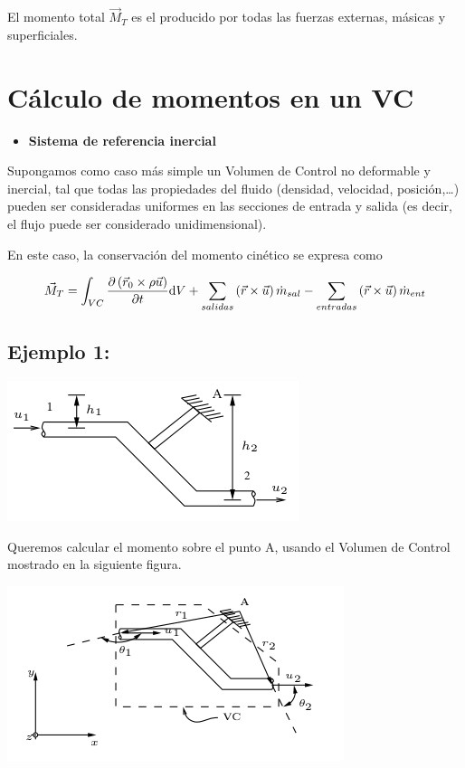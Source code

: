 	El momento total $\vec{M}_{T}$ es el producido por todas las fuerzas
	externas, másicas y superficiales.


\section{Cálculo de momentos en un VC}

	
	\begin{itemize}
		\item \textbf{Sistema de referencia inercial}
	\end{itemize}
	Supongamos como caso más simple un Volumen de Control no deformable
	y inercial, tal que todas las propiedades del fluido (densidad, velocidad,
	posición,\ldots ) pueden ser consideradas uniformes en las secciones
	de entrada y salida (es decir, el flujo puede ser considerado unidimensional). 
	
	En este caso, la conservación del momento cinético se expresa como
	
\begin{equation}
		\vec{M}_{T}=\int_{VC}\frac{\partial \left(\vec{r}_{0}\times\rho\vec{u}\right)}{\partial t}\text{d} V+\sum_{salidas}\left(\vec{r}\times\vec{u}\right)\dot{m}_{sal}-\sum_{entradas}\left(\vec{r}\times\vec{u}\right)\dot{m}_{ent}
\end{equation}
	
	

	
	\subsection{Ejemplo 1:}
		
		\begin{center}
			\includegraphics[width=0.5\linewidth]{TeX_files/chapter04-Dinamica/ejemplo1CMC}
		\end{center}
		
		
		Queremos calcular el momento sobre el punto A, usando el Volumen de
		Control mostrado en la siguiente figura.
		
		\begin{center}
			\includegraphics[width=0.5\linewidth]{TeX_files/chapter04-Dinamica/ejemplo1CMC1}
		\end{center}
		

